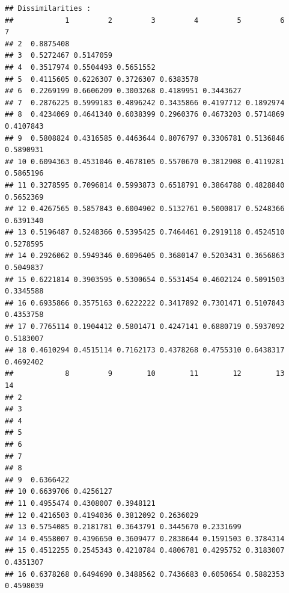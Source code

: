\documentclass[
]{article}
\begin{document}
\begin{verbatim}
## Dissimilarities :
##            1         2         3         4         5         6         7
## 2  0.8875408                                                            
## 3  0.5272467 0.5147059                                                  
## 4  0.3517974 0.5504493 0.5651552                                        
## 5  0.4115605 0.6226307 0.3726307 0.6383578                              
## 6  0.2269199 0.6606209 0.3003268 0.4189951 0.3443627                    
## 7  0.2876225 0.5999183 0.4896242 0.3435866 0.4197712 0.1892974          
## 8  0.4234069 0.4641340 0.6038399 0.2960376 0.4673203 0.5714869 0.4107843
## 9  0.5808824 0.4316585 0.4463644 0.8076797 0.3306781 0.5136846 0.5890931
## 10 0.6094363 0.4531046 0.4678105 0.5570670 0.3812908 0.4119281 0.5865196
## 11 0.3278595 0.7096814 0.5993873 0.6518791 0.3864788 0.4828840 0.5652369
## 12 0.4267565 0.5857843 0.6004902 0.5132761 0.5000817 0.5248366 0.6391340
## 13 0.5196487 0.5248366 0.5395425 0.7464461 0.2919118 0.4524510 0.5278595
## 14 0.2926062 0.5949346 0.6096405 0.3680147 0.5203431 0.3656863 0.5049837
## 15 0.6221814 0.3903595 0.5300654 0.5531454 0.4602124 0.5091503 0.3345588
## 16 0.6935866 0.3575163 0.6222222 0.3417892 0.7301471 0.5107843 0.4353758
## 17 0.7765114 0.1904412 0.5801471 0.4247141 0.6880719 0.5937092 0.5183007
## 18 0.4610294 0.4515114 0.7162173 0.4378268 0.4755310 0.6438317 0.4692402
##            8         9        10        11        12        13        14
## 2                                                                       
## 3                                                                       
## 4                                                                       
## 5                                                                       
## 6                                                                       
## 7                                                                       
## 8                                                                       
## 9  0.6366422                                                            
## 10 0.6639706 0.4256127                                                  
## 11 0.4955474 0.4308007 0.3948121                                        
## 12 0.4216503 0.4194036 0.3812092 0.2636029                              
## 13 0.5754085 0.2181781 0.3643791 0.3445670 0.2331699                    
## 14 0.4558007 0.4396650 0.3609477 0.2838644 0.1591503 0.3784314          
## 15 0.4512255 0.2545343 0.4210784 0.4806781 0.4295752 0.3183007 0.4351307
## 16 0.6378268 0.6494690 0.3488562 0.7436683 0.6050654 0.5882353 0.4598039

\end{verbatim}
\end{document}
